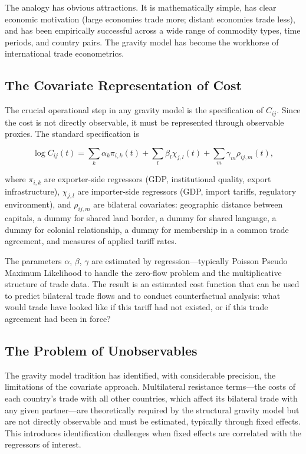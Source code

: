 \documentclass[12pt]{article}
\begin{document}
The analogy has obvious attractions. It is mathematically simple, has clear economic motivation (large economies trade more; distant economies trade less), and has been empirically successful across a wide range of commodity types, time periods, and country pairs. The gravity model has become the workhorse of international trade econometrics.

\subsection{The Covariate Representation of Cost}

The crucial operational step in any gravity model is the specification of $C_{ij}$. Since the cost is not directly observable, it must be represented through observable proxies. The standard specification is

\begin{equation}
\log C_{ij}(t) = \sum_k \alpha_k \pi_{i,k}(t) + \sum_l \beta_l \chi_{j,l}(t) + \sum_m \gamma_m \rho_{ij,m}(t),
\label{eq:gravity_cost}
\end{equation}

where $\pi_{i,k}$ are exporter-side regressors (GDP, institutional quality, export infrastructure), $\chi_{j,l}$ are importer-side regressors (GDP, import tariffs, regulatory environment), and $\rho_{ij,m}$ are bilateral covariates: geographic distance between capitals, a dummy for shared land border, a dummy for shared language, a dummy for colonial relationship, a dummy for membership in a common trade agreement, and measures of applied tariff rates.

The parameters $\alpha$, $\beta$, $\gamma$ are estimated by regression---typically Poisson Pseudo Maximum Likelihood \citep[PPML;][]{silva2006} to handle the zero-flow problem and the multiplicative structure of trade data. The result is an estimated cost function that can be used to predict bilateral trade flows and to conduct counterfactual analysis: what would trade have looked like if this tariff had not existed, or if this trade agreement had been in force?

\subsection{The Problem of Unobservables}

The gravity model tradition has identified, with considerable precision, the limitations of the covariate approach. Multilateral resistance terms---the costs of each country's trade with all other countries, which affect its bilateral trade with any given partner---are theoretically required by the structural gravity model but are not directly observable and must be estimated, typically through fixed effects. This introduces identification challenges when fixed effects are correlated with the regressors of interest.
\end{document}
